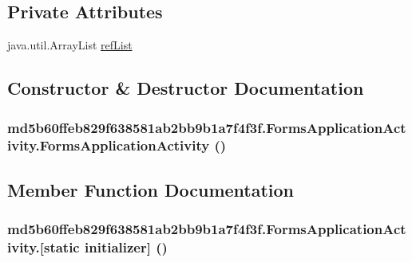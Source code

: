 \subsection*{Private Attributes}
\begin{CompactItemize}
\item 
java.util.ArrayList \hyperlink{classmd5b60ffeb829f638581ab2bb9b1a7f4f3f_1_1_forms_application_activity_b244a537e01278d3ee4186b6bceb6755}{refList}
\end{CompactItemize}


\subsection{Constructor \& Destructor Documentation}
\hypertarget{classmd5b60ffeb829f638581ab2bb9b1a7f4f3f_1_1_forms_application_activity_3abb4f0a66515b68876a15e4a4b30e07}{
\subsubsection[{FormsApplicationActivity}]{\setlength{\rightskip}{0pt plus 5cm}md5b60ffeb829f638581ab2bb9b1a7f4f3f.FormsApplicationActivity.FormsApplicationActivity ()}}
\label{classmd5b60ffeb829f638581ab2bb9b1a7f4f3f_1_1_forms_application_activity_3abb4f0a66515b68876a15e4a4b30e07}




\subsection{Member Function Documentation}
\hypertarget{classmd5b60ffeb829f638581ab2bb9b1a7f4f3f_1_1_forms_application_activity_7e80971fb4184461dc21b70a23a7e601}{
\subsubsection[{[static initializer]}]{\setlength{\rightskip}{0pt plus 5cm}md5b60ffeb829f638581ab2bb9b1a7f4f3f.FormsApplicationActivity.\mbox{[}static initializer\mbox{]} ()}}
\label{classmd5b60ffeb829f638581ab2bb9b1a7f4f3f_1_1_forms_application_activity_7e80971fb4184461dc21b70a23a7e601}




